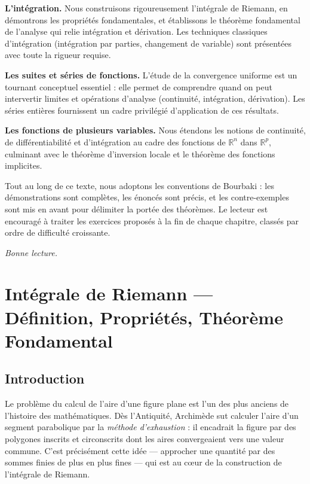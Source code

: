 \documentclass[12pt,a4paper,openany]{book}
\theoremstyle{definition}
\newcommand{\R}{\mathbb{R}}
\begin{document}
\medskip

\noindent\textbf{L'intégration.} Nous construisons rigoureusement l'intégrale de Riemann, en démontrons les propriétés fondamentales, et établissons le théorème fondamental de l'analyse qui relie intégration et dérivation. Les techniques classiques d'intégration (intégration par parties, changement de variable) sont présentées avec toute la rigueur requise.

\medskip

\noindent\textbf{Les suites et séries de fonctions.} L'étude de la convergence uniforme est un tournant conceptuel essentiel : elle permet de comprendre quand on peut intervertir limites et opérations d'analyse (continuité, intégration, dérivation). Les séries entières fournissent un cadre privilégié d'application de ces résultats.

\medskip

\noindent\textbf{Les fonctions de plusieurs variables.} Nous étendons les notions de continuité, de différentiabilité et d'intégration au cadre des fonctions de $\R^n$ dans $\R^p$, culminant avec le théorème d'inversion locale et le théorème des fonctions implicites.

\medskip

Tout au long de ce texte, nous adoptons les conventions de Bourbaki : les démonstrations sont complètes, les énoncés sont précis, et les contre-exemples sont mis en avant pour délimiter la portée des théorèmes. Le lecteur est encouragé à traiter les exercices proposés à la fin de chaque chapitre, classés par ordre de difficulté croissante.

\bigskip

\hfill\emph{Bonne lecture.}

\chapter{Intégrale de Riemann --- Définition, Propriétés, Théorème Fondamental}
\label{chap:integrale-riemann}

\section*{Introduction}

Le problème du calcul de l'aire d'une figure plane est l'un des plus anciens de l'histoire des mathématiques. Dès l'Antiquité, Archimède sut calculer l'aire d'un segment parabolique par la \emph{méthode d'exhaustion} : il encadrait la figure par des polygones inscrits et circonscrits dont les aires convergeaient vers une valeur commune. C'est précisément cette idée --- approcher une quantité par des sommes finies de plus en plus fines --- qui est au c\oe ur de la construction de l'intégrale de Riemann.
\end{document}
